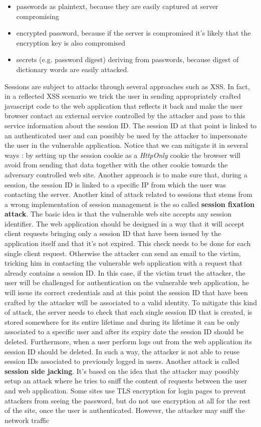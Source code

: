 \begin{itemize}
\item passwords as plaintext, because they are easily captured at server compromising
\item encrypted password, because if the server is compromised it's likely that the encryption key is also compromised
\item secrets (e.g. password digest) deriving from passwords, because digest of dictionary words are easily attacked.
\end{itemize} 
Sessions are subject to attacks through several approaches such as XSS. In fact, in a reflected XSS scenario we trick the user in sending appropriately crafted javascript code to the web application that reflects it back and make the user browser contact an external service controlled by the attacker and pass to this service information about the session ID. The session ID at that point is linked to an authenticated user and can possibly be used by the attacker to impersonate the user in the vulnerable application. Notice that we can mitigate it in several ways : by setting up the session cookie as a \textit{HttpOnly} cookie the browser will avoid from sending that data together with the other cookie towards the adversary controlled web site. Another approach is to make sure that, during a session, the session ID is linked to a specific IP from which the user was contacting the server. Another kind of attack related to sessions that stems from a wrong implementation of session management is the so called \textbf{session fixation attack}. The basic idea is that the vulnerable web site accepts any session identifier. The web application should be designed in a way that it will accept client requests bringing only a session ID that have been issued by the application itself and that it's not expired. This check needs to be done for each single client request. Otherwise the attacker can send an email to the victim, tricking him in contacting the vulnerable web application with a request that already contains a session ID. In this case, if the victim trust the attacker, the user will be challenged for authentication on the vulnerable web application, he will issue its correct credentials and at this point the session ID that have been crafted by the attacker will be associated to a valid identity. To mitigate this kind of attack, the server needs to check that each single session ID that is created, is stored somewhere for its entire lifetime and during its lifetime it can be only associated to a specific user and after its expiry date the session ID should be deleted. Furthermore, when a user perform logs out from the web application its session ID should be deleted. In such a way, the attacker is not able to reuse session IDs associated to previously logged in users. Another attack is called \textbf{session side jacking}. It's based on the idea that the attacker may possibly setup an attack where he tries to sniff the content of requests between the user and web application. Some sites use TLS encryption for login pages to prevent attackers from seeing the password, but do not use encryption at all for the rest of the site, once the user is authenticated. However, the attacker may sniff the network traffic 